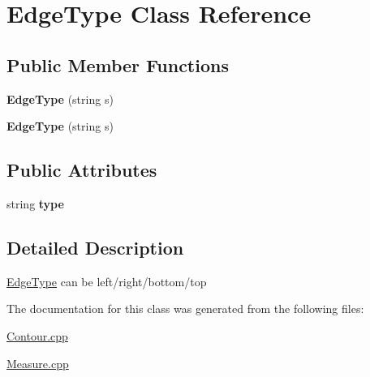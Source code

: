 \hypertarget{classEdgeType}{}\section{Edge\+Type Class Reference}
\label{classEdgeType}
\subsection*{Public Member Functions}
\begin{DoxyCompactItemize}
\item 
\mbox{\label{classEdgeType_ae51644845cd7198b12f9cc20cd2b4589}} 
{\bfseries Edge\+Type} (string s)
\item 
\mbox{\label{classEdgeType_ae51644845cd7198b12f9cc20cd2b4589}} 
{\bfseries Edge\+Type} (string s)
\end{DoxyCompactItemize}
\subsection*{Public Attributes}
\begin{DoxyCompactItemize}
\item 
\mbox{\label{classEdgeType_a2878d29fd9a71bac482e065c72fda811}} 
string {\bfseries type}
\end{DoxyCompactItemize}


\subsection{Detailed Description}
\hyperlink{classEdgeType}{Edge\+Type} can be left/right/bottom/top 

The documentation for this class was generated from the following files\+:\begin{DoxyCompactItemize}
\item 
\hyperlink{Contour_8cpp}{Contour.\+cpp}\item 
\hyperlink{Measure_8cpp}{Measure.\+cpp}\end{DoxyCompactItemize}
